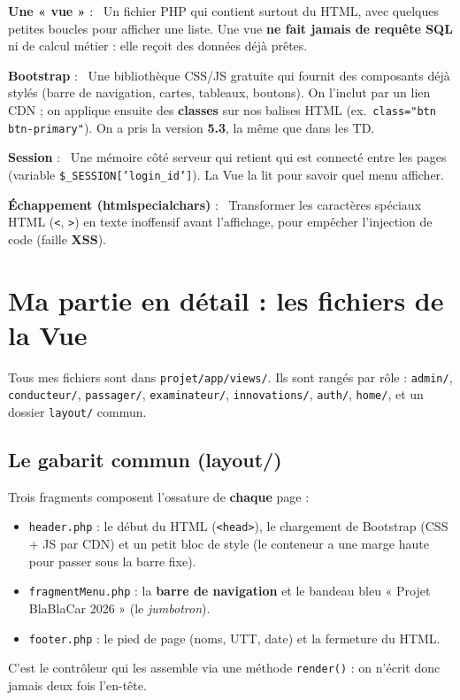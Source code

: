 \documentclass[11pt,a4paper]{article}
\newcommand{\motcle}[1]{\noindent\textbf{\color{bleu}#1} :\ }
\begin{document}
\motcle{Une « vue »} Un fichier PHP qui contient surtout du HTML, avec quelques
petites boucles pour afficher une liste. Une vue \textbf{ne fait jamais de requête
SQL} ni de calcul métier : elle reçoit des données déjà prêtes.

\motcle{Bootstrap} Une bibliothèque CSS/JS gratuite qui fournit des composants
déjà stylés (barre de navigation, cartes, tableaux, boutons). On l'inclut par un
lien CDN ; on applique ensuite des \textbf{classes} sur nos balises HTML
(ex.~\texttt{class="btn btn-primary"}). On a pris la version \textbf{5.3}, la même
que dans les TD.

\motcle{Session} Une mémoire côté serveur qui retient qui est connecté entre les
pages (variable \texttt{\$\_SESSION['login\_id']}). La Vue la lit pour savoir quel
menu afficher.

\motcle{Échappement (htmlspecialchars)} Transformer les caractères spéciaux HTML
(\texttt{<}, \texttt{>}) en texte inoffensif avant l'affichage, pour empêcher
l'injection de code (faille \textbf{XSS}).

\section{Ma partie en détail : les fichiers de la Vue}

Tous mes fichiers sont dans \texttt{projet/app/views/}. Ils sont rangés par rôle :
\texttt{admin/}, \texttt{conducteur/}, \texttt{passager/}, \texttt{examinateur/},
\texttt{innovations/}, \texttt{auth/}, \texttt{home/}, et un dossier
\texttt{layout/} commun.

\subsection{Le gabarit commun (layout/)}
Trois fragments composent l'ossature de \textbf{chaque} page :
\begin{itemize}[noitemsep]
  \item \texttt{header.php} : le début du HTML (\texttt{<head>}), le chargement de
        Bootstrap (CSS + JS par CDN) et un petit bloc de style (le conteneur a une
        marge haute pour passer sous la barre fixe).
  \item \texttt{fragmentMenu.php} : la \textbf{barre de navigation} et le bandeau
        bleu « Projet BlaBlaCar 2026 » (le \emph{jumbotron}).
  \item \texttt{footer.php} : le pied de page (noms, UTT, date) et la fermeture du HTML.
\end{itemize}
C'est le contrôleur qui les assemble via une méthode \texttt{render()} : on n'écrit
donc jamais deux fois l'en-tête.
\end{document}
